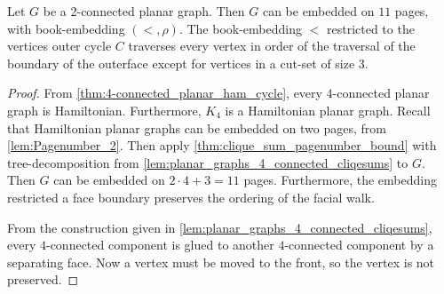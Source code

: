 \begin{corollary}\label{thm:Planar Graph Hickingbotham Bound}
	Let \(G\) be a 2-connected planar graph. Then $G$ can be embedded on $11$ pages, with book-embedding $(<, \rho)$. The book-embedding $<$ restricted to the vertices outer cycle $C$ traverses every vertex in order of the traversal of the boundary of the outerface except for vertices in a cut-set of size 3.
\end{corollary}
\begin{proof}
	From \cref{thm:4-connected_planar_ham_cycle}, every $4$-connected planar graph is Hamiltonian. Furthermore, $K_4$ is a Hamiltonian planar graph.
	Recall that Hamiltonian planar graphs can be embedded on two pages, from \cref{lem:Pagenumber_2}. 
	Then apply \cref{thm:clique_sum_pagenumber_bound} with tree-decomposition from \cref{lem:planar_graphs_4_connected_cliqesums} to $G$. Then $G$ can be embedded on \(2 \cdot 4 + 3 = 11\) pages. Furthermore, the embedding restricted a face boundary preserves the ordering of the facial walk.

	From the construction given in \cref{lem:planar_graphs_4_connected_cliqesums}, every $4$-connected component is glued to another $4$-connected component by a separating face. Now a vertex must be moved to the front, so the vertex is not preserved. 
\end{proof}


